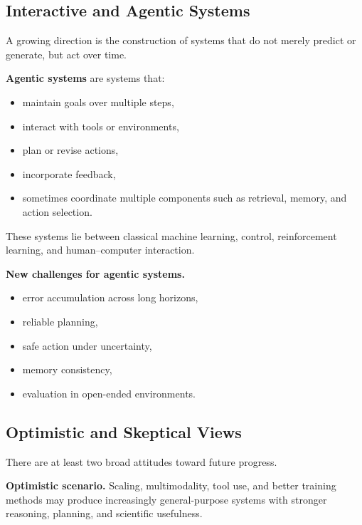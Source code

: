 \subsection{Interactive and Agentic Systems}

A growing direction is the construction of systems that do not merely predict or generate, but act over time.

\medskip

\noindent
\textbf{Agentic systems} are systems that:
\begin{itemize}
    \item maintain goals over multiple steps,
    \item interact with tools or environments,
    \item plan or revise actions,
    \item incorporate feedback,
    \item sometimes coordinate multiple components such as retrieval, memory, and action selection.
\end{itemize}

\medskip

\noindent
These systems lie between classical machine learning, control, reinforcement learning, and human--computer interaction.

\medskip

\noindent
\textbf{New challenges for agentic systems.}
\begin{itemize}
    \item error accumulation across long horizons,
    \item reliable planning,
    \item safe action under uncertainty,
    \item memory consistency,
    \item evaluation in open-ended environments.
\end{itemize}

\subsection{Optimistic and Skeptical Views}

There are at least two broad attitudes toward future progress.

\medskip

\noindent
\textbf{Optimistic scenario.}
Scaling, multimodality, tool use, and better training methods may produce increasingly general-purpose systems with stronger reasoning, planning, and scientific usefulness.

